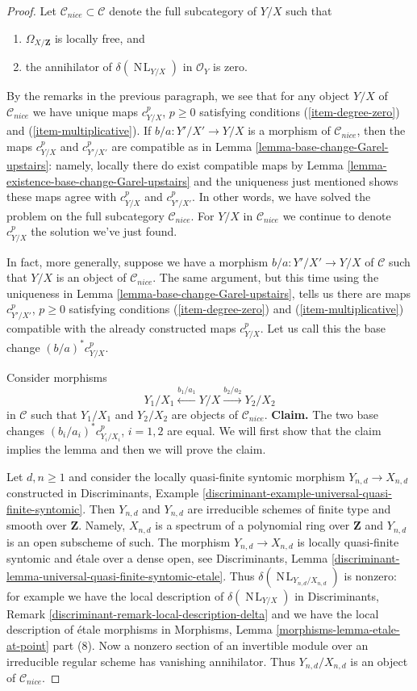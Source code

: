 \documentclass[10pt,a4paper]{amsart}
\theoremstyle{plain}
\theoremstyle{definition}
\theoremstyle{remark}
\numberwithin{equation}{subsection}
\def\NL{\mathop{N\!L}\nolimits}
\begin{document}
\begin{proof}
\medskip\noindent
Let $\mathcal{C}_{nice} \subset \mathcal{C}$ denote the full subcategory
of $Y/X$ such that
\begin{enumerate}
\item $\Omega_{X/\mathbf{Z}}$ is locally free, and
\item the annihilator of $\delta(\NL_{Y/X})$ in $\mathcal{O}_Y$ is zero.
\end{enumerate}
By the remarks in the previous paragraph, we see that for any
object $Y/X$ of $\mathcal{C}_{nice}$ we have unique maps
$c^p_{Y/X}$, $p \geq 0$ satisfying conditions (\ref{item-degree-zero})
and (\ref{item-multiplicative}). If $b/a : Y'/X' \to Y/X$
is a morphism of $\mathcal{C}_{nice}$, then the maps
$c^p_{Y/X}$ and $c^p_{Y'/X'}$ are compatible as in
Lemma \ref{lemma-base-change-Garel-upstairs}: namely,
locally there do exist compatible maps by
Lemma \ref{lemma-existence-base-change-Garel-upstairs}
and the uniqueness just mentioned shows these maps agree
with $c^p_{Y/X}$ and $c^p_{Y'/X'}$.
In other words, we have solved the problem
on the full subcategory $\mathcal{C}_{nice}$. For $Y/X$ in $\mathcal{C}_{nice}$
we continue to denote $c^p_{Y/X}$ the solution we've just found.

\medskip\noindent
In fact, more generally, suppose we have a morphism $b/a : Y'/X' \to Y/X$
of $\mathcal{C}$ such that $Y/X$ is an object of $\mathcal{C}_{nice}$.
The same argument, but this time using the uniqueness in
Lemma \ref{lemma-base-change-Garel-upstairs}, tells us there are
maps $c^p_{Y'/X'}$, $p \geq 0$  satisfying conditions (\ref{item-degree-zero})
and (\ref{item-multiplicative}) compatible with the already constructed
maps $c^p_{Y/X}$. Let us call this the base change
$(b/a)^*c^p_{Y/X}$.

\medskip\noindent
Consider morphisms
$$
Y_1/X_1 \xleftarrow{b_1/a_1} Y/X \xrightarrow{b_2/a_2} Y_2/X_2
$$
in $\mathcal{C}$ such that $Y_1/X_1$ and $Y_2/X_2$ are objects
of $\mathcal{C}_{nice}$.
{\bf Claim.} The two base changes $(b_i/a_i)^*c^p_{Y_i/X_i}$, $i = 1, 2$
are equal. We will first show that the claim implies the lemma
and then we will prove the claim.

\medskip\noindent
Let $d, n \geq 1$ and consider the locally
quasi-finite syntomic morphism $Y_{n, d} \to X_{n, d}$
constructed in Discriminants, Example
\ref{discriminant-example-universal-quasi-finite-syntomic}.
Then $Y_{n, d}$ and $Y_{n, d}$ are irreducible schemes of finite type and
smooth over $\mathbf{Z}$. Namely, $X_{n, d}$ is a spectrum of a
polynomial ring over $\mathbf{Z}$ and $Y_{n, d}$ is an open subscheme
of such. The morphism $Y_{n, d} \to X_{n, d}$ is locally quasi-finite syntomic
and \'etale over a dense open, see Discriminants, Lemma
\ref{discriminant-lemma-universal-quasi-finite-syntomic-etale}.
Thus $\delta(\NL_{Y_{n, d}/X_{n, d}})$ is nonzero: for example we have
the local description of $\delta(\NL_{Y/X})$ in
Discriminants, Remark \ref{discriminant-remark-local-description-delta}
and we have the local description of \'etale morphisms in
Morphisms, Lemma \ref{morphisms-lemma-etale-at-point} part (8).
Now a nonzero section of an invertible module over an irreducible
regular scheme has vanishing annihilator. Thus
$Y_{n, d}/X_{n, d}$ is an object of $\mathcal{C}_{nice}$.


\end{proof}
\end{document}
